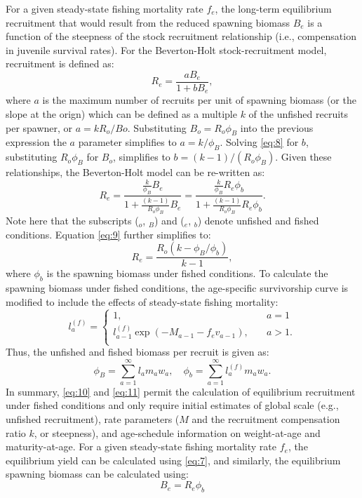 \documentclass[12pt]{article}
\begin{document}
For a given steady-state fishing mortality rate $f_e$, the long-term equilibrium recruitment that would result from the reduced spawning biomass $B_e$ is a function of the steepness of the stock recruitment relationship (i.e., compensation in juvenile survival rates).  For the Beverton-Holt stock-recruitment model, recruitment is defined as:
\begin{equation}\label{eq:8}
	R_e = \frac{a B_e}{1+b B_e},
\end{equation}
where $a$ is the maximum number of recruits per unit of spawning biomass (or the slope at the orign) which can be defined as a multiple $k$ of the unfished recruits per spawner, or $a = kR_o/Bo$.  Substituting $B_o = R_o \phi_B$ into the previous expression the $a$ parameter simplifies to $a=k/\phi_B$. Solving \eqref{eq:8} for $b$, substituting $R_o \phi_B$ for $B_o$, simplifies to $b=(k-1)/(R_o\phi_B)$.  Given these relationships, the Beverton-Holt model can be re-written as:
\begin{equation}\label{eq:9}
	R_e = \dfrac{\frac{k}{\phi_B}B_e}{1+\frac{(k-1)}{R_o\phi_B}B_e}
	    = \dfrac{\frac{k}{\phi_B}R_e\phi_b}{1+\frac{(k-1)}{R_o\phi_B}R_e\phi_b}.
\end{equation}
Note here that the subscripts ($_o$, $_B$) and ($_e$, $_b$) denote unfished and fished conditions.  Equation \ref{eq:9} further simplifies to:
\begin{equation}\label{eq:10}
	R_e = \frac{R_o(k-\phi_B/\phi_b)}{k-1},
\end{equation}
where $\phi_b$ is the spawning biomass under fished conditions.  To calculate the spawning biomass under fished conditions, the age-specific survivorship curve is modified to include the effects of steady-state fishing mortality:
\begin{equation}\label{eq:11}
	l_a^{(f)} = \begin{cases}
	    1, &\quad a=1\\
	    l_{a-1}^{(f)}\exp(-M_{a-1}-f_e v_{a-1}), &\quad a>1.\\
	\end{cases}
\end{equation}
Thus, the unfished and fished biomass per recruit is given as:
 \[
 \phi_B = \sum_{a=1}^\infty l_a m_a w_a, \quad
 \phi_b = \sum_{a=1}^\infty l_a^{(f)} m_a w_a.
 \]
In summary, \eqref{eq:10} and \eqref{eq:11} permit the calculation of equilibrium recruitment under fished conditions and only require initial estimates of global scale (e.g., unfished recruitment), rate parameters ($M$ and the recruitment compensation ratio $k$, or steepness), and age-schedule information on weight-at-age and maturity-at-age.  For a given steady-state fishing mortality rate $f_e$, the equilibrium yield can be calculated using \eqref{eq:7}, and similarly, the equilibrium spawning biomass can be calculated using:
\begin{equation}\label{eq:12}
	B_e = R_e \phi_b
\end{equation}
\end{document}
